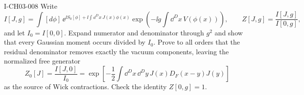 \begin{exercise}{I-CH03-008}
Write
\[
 I[J,g]=\int[d\phi]\,\ee^{\ii S_0[\phi]+\ii\int\dd^D x\,J(x)\phi(x)}
 \exp\!\left(-\ii g\int\dd^D x\,V(\phi(x))\right),
 \qquad Z[J,g]=\frac{I[J,g]}{I[0,g]},
\]
and let $I_0=I[0,0]$.  Expand numerator and denominator through $g^2$ and
show that every Gaussian moment occurs divided by $I_0$.  Prove to all orders
that the residual denominator removes exactly the vacuum components, leaving
the normalized free generator
\[
 Z_0[J]=\frac{I[J,0]}{I_0}
 =\exp\!\left[-\frac12\int\dd^D x\,\dd^D y\,
 J(x)D_F(x-y)J(y)\right]
\]
as the source of Wick contractions.  Check the identity $Z[0,g]=1$.
\end{exercise}
